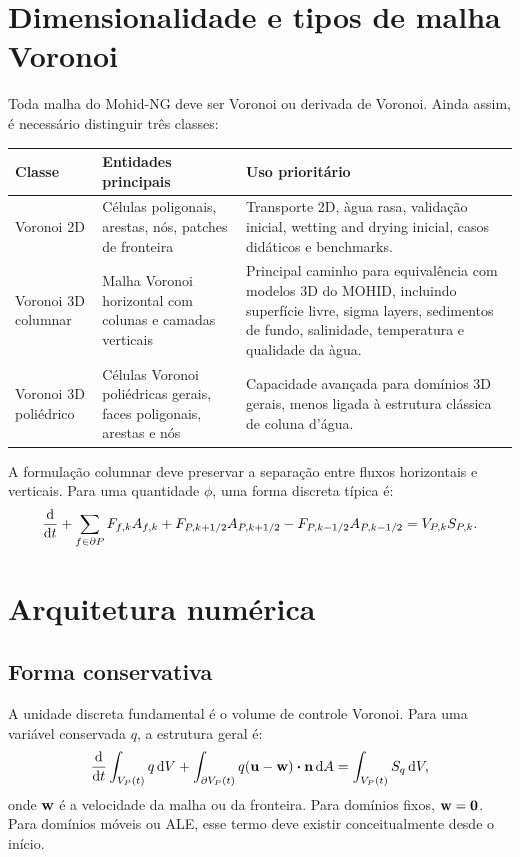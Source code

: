 \documentclass[11pt,a4paper]{article}
\begin{document}
\section{Dimensionalidade e tipos de malha Voronoi}

Toda malha do Mohid-NG deve ser Voronoi ou derivada de Voronoi. Ainda assim, \'e necess\'ario distinguir tr\^es classes:

\begin{longtable}{p{}p{}p{}}
\toprule
\textbf{Classe} & \textbf{Entidades principais} & \textbf{Uso priorit\'ario}\tabularnewline
\midrule
Voronoi 2D & C\'elulas poligonais, arestas, n\'os, patches de fronteira & Transporte 2D, \`agua rasa, valida\c{c}\~ao inicial, wetting and drying inicial, casos did\'aticos e benchmarks.\tabularnewline
\addlinespace
Voronoi 3D columnar & Malha Voronoi horizontal com colunas e camadas verticais & Principal caminho para equival\^encia com modelos 3D do MOHID, incluindo superf\'icie livre, sigma layers, sedimentos de fundo, salinidade, temperatura e qualidade da \`agua.\tabularnewline
\addlinespace
Voronoi 3D poli\'edrico & C\'elulas Voronoi poli\'edricas gerais, faces poligonais, arestas e n\'os & Capacidade avan\c{c}ada para dom\'inios 3D gerais, menos ligada \`a estrutura cl\'assica de coluna d'\'agua.\tabularnewline
\bottomrule
\end{longtable}

A formula\c{c}\~ao columnar deve preservar a separa\c{c}\~ao entre fluxos horizontais e verticais. Para uma quantidade \(\phi\), uma forma discreta t\'ipica \'e:
\[
\dv{}{t}(V_{P,k}\phi_{P,k})
+
\sum_{f\in\partial P} F_{f,k}A_{f,k}
+
F_{P,k+1/2}A_{P,k+1/2}
-
F_{P,k-1/2}A_{P,k-1/2}
=
V_{P,k}S_{P,k}.
\]

\section{Arquitetura num\'erica}

\subsection{Forma conservativa}

A unidade discreta fundamental \'e o volume de controle Voronoi. Para uma vari\'avel conservada \(q\), a estrutura geral \'e:
\[
\dv{}{t}\int_{V_P(t)}q\,\dd V
+
\int_{\partial V_P(t)} q(\vb{u}-\vb{w})\vdot\vb{n}\,\dd A
=
\int_{V_P(t)}S_q\,\dd V,
\]
onde \(\vb{w}\) \'e a velocidade da malha ou da fronteira. Para dom\'inios fixos, \(\vb{w}=\vb{0}\). Para dom\'inios m\'oveis ou ALE, esse termo deve existir conceitualmente desde o in\'icio.
\end{document}
